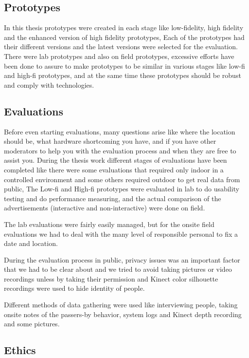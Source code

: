 \subsection{Prototypes}
In this thesis prototypes were created in each stage like low-fidelity, high fidelity and the enhanced version of high fidelity prototypes, Each of the prototypes had their different versions and the latest versions were selected for the evaluation. There were lab prototypes and also on field prototypes, excessive efforts have been done to assure to make prototypes to be similar in various stages like low-fi and high-fi prototypes, and at the same time these prototypes should be robust and comply with technologies.  


\subsection{Evaluations}
Before even starting evaluations, many questions arise like where the location should be, what hardware shortcoming you have, and if you have other moderators to help you with the evaluation process and when they are free to assist you. During the thesis work different stages of evaluations have been completed like there were some evaluations that required only indoor in a controlled environment and some others required outdoor to get real data from public, The Low-fi and High-fi prototypes were evaluated in lab to do usability testing and do performance measuring, and the actual comparison of the advertisements (interactive and non-interactive) were done on field. 

The lab evaluations were fairly easily managed, but for the onsite field evaluations we had to deal with the many level of responsible personal to fix a date and location. 

During the evaluation process in public, privacy issues was an important factor that we had to be clear about and we tried to avoid taking pictures or video recordings unless by taking their permission and Kinect color silhouette recordings were used to hide identity of people.

Different methods of data gathering were used like interviewing people, taking onsite notes of the passers-by behavior, system logs and Kinect depth recording and some pictures. 


\subsection{Ethics}

